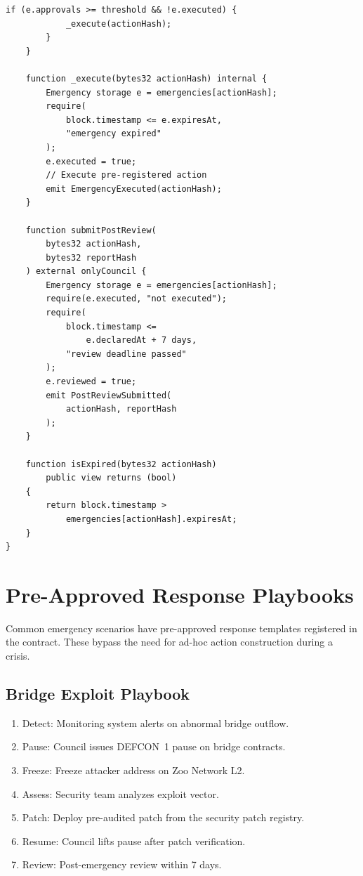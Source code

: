 \documentclass[11pt,letterpaper]{article}
\begin{document}
\begin{lstlisting}[language=Solidity,caption=EmergencyCouncil contract]
        if (e.approvals >= threshold && !e.executed) {
            _execute(actionHash);
        }
    }

    function _execute(bytes32 actionHash) internal {
        Emergency storage e = emergencies[actionHash];
        require(
            block.timestamp <= e.expiresAt,
            "emergency expired"
        );
        e.executed = true;
        // Execute pre-registered action
        emit EmergencyExecuted(actionHash);
    }

    function submitPostReview(
        bytes32 actionHash,
        bytes32 reportHash
    ) external onlyCouncil {
        Emergency storage e = emergencies[actionHash];
        require(e.executed, "not executed");
        require(
            block.timestamp <=
                e.declaredAt + 7 days,
            "review deadline passed"
        );
        e.reviewed = true;
        emit PostReviewSubmitted(
            actionHash, reportHash
        );
    }

    function isExpired(bytes32 actionHash)
        public view returns (bool)
    {
        return block.timestamp >
            emergencies[actionHash].expiresAt;
    }
}
\end{lstlisting}

\section{Pre-Approved Response Playbooks}
\label{sec:playbooks}

Common emergency scenarios have pre-approved response templates registered in the contract. These bypass the need for ad-hoc action construction during a crisis.

\subsection{Bridge Exploit Playbook}

\begin{enumerate}
    \item Detect: Monitoring system alerts on abnormal bridge outflow.
    \item Pause: Council issues DEFCON~1 pause on bridge contracts.
    \item Freeze: Freeze attacker address on Zoo Network L2.
    \item Assess: Security team analyzes exploit vector.
    \item Patch: Deploy pre-audited patch from the security patch registry.
    \item Resume: Council lifts pause after patch verification.
    \item Review: Post-emergency review within 7 days.
\end{enumerate}
\end{document}
